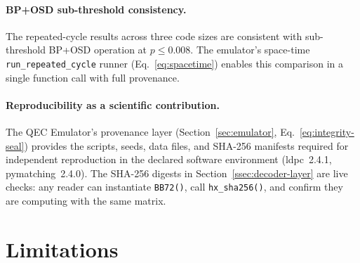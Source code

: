 \documentclass[11pt,a4paper]{article}
\begin{document}
\paragraph{BP+OSD sub-threshold consistency.}
The repeated-cycle results across three code sizes are consistent with
sub-threshold BP+OSD operation at $p\le0.008$.
The emulator's space-time \texttt{run\_repeated\_cycle} runner
(Eq.~\ref{eq:spacetime}) enables this comparison in a single function call
with full provenance.

\paragraph{Reproducibility as a scientific contribution.}
The QEC Emulator's provenance layer (Section~\ref{sec:emulator},
Eq.~\ref{eq:integrity-seal}) provides the scripts, seeds, data files, and SHA-256 manifests required for
independent reproduction in the declared software environment (ldpc~2.4.1, pymatching~2.4.0).
The SHA-256 digests in Section~\ref{ssec:decoder-layer} are live checks:
any reader can instantiate \texttt{BB72()}, call \texttt{hx\_sha256()},
and confirm they are computing with the same matrix.

\section{Limitations}
\label{sec:limitations}
\end{document}
